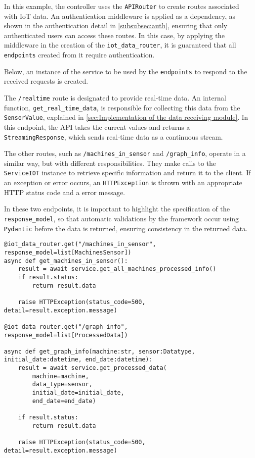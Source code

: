 In this example, the controller uses the \texttt{APIRouter} to create routes associated with IoT data. An authentication middleware is applied as a dependency, as shown in the authentication detail in \ref{subsubsec:auth}, ensuring that only authenticated users can access these routes. In this case, by applying the middleware in the creation of the \texttt{iot\_data\_router}, it is guaranteed that all \texttt{endpoints} created from it require authentication.

Below, an instance of the service to be used by the \texttt{endpoints} to respond to the received requests is created.

The \texttt{/realtime} route is designated to provide real-time data. An internal function, \texttt{get\_real\_time\_data}, is responsible for collecting this data from the \texttt{SensorValue}, explained in \ref{sec:Implementation of the data receiving module}. In this endpoint, the \gls{API} takes the current values and returns a \texttt{StreamingResponse}, which sends real-time data as a continuous stream.

The other routes, such as \texttt{/machines\_in\_sensor} and \texttt{/graph\_info}, operate in a similar way, but with different responsibilities. They make calls to the \texttt{ServiceIOT} instance to retrieve specific information and return it to the client. If an exception or error occurs, an \texttt{HTTPException} is thrown with an appropriate HTTP status code and a error message.

In these two endpoints, it is important to highlight the specification of the \texttt{response\_model}, so that automatic validations by the framework occur using \texttt{Pydantic} before the data is returned, ensuring consistency in the returned data.

\begin{Verbatim}[fontsize=\small, baselinestretch=0.6]
@iot_data_router.get("/machines_in_sensor", response_model=list[MachinesSensor])
async def get_machines_in_sensor():
    result = await service.get_all_machines_processed_info()
    if result.status:
        return result.data
    
    raise HTTPException(status_code=500, detail=result.exception.message)

@iot_data_router.get("/graph_info", response_model=list[ProcessedData])

async def get_graph_info(machine:str, sensor:Datatype, initial_date:datetime, end_date:datetime):
    result = await service.get_processed_data(
        machine=machine,
        data_type=sensor,
        initial_date=initial_date,
        end_date=end_date)
    
    if result.status:
        return result.data
    
    raise HTTPException(status_code=500, detail=result.exception.message)
\end{Verbatim}

